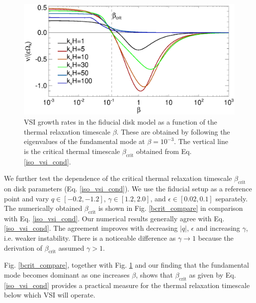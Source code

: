 \begin{figure}
   \includegraphics[width=\linewidth]{figures/gcorr_compare2} 
   \caption{VSI growth rates in the fiducial disk
     model as a function of the thermal relaxation timescale
     $\beta$. These are obtained by following the eigenvalues of the
     fundamental mode at $\beta=10^{-3}$. The vertical line is the
     critical thermal timescale $\beta_\mathrm{crit}$ obtained  
     from Eq. \ref{iso_vsi_cond}. 
     \label{bcrit_compare1}}   
 \end{figure} 
 
 We further test the dependence of the critical thermal relaxation timescale 
 $\beta_\mathrm{crit}$ on disk parameters
 (Eq. \ref{iso_vsi_cond}).  We use the fiducial setup as a
 reference point and vary $q\in[-0.2,-1.2]$, 
 $\gamma\in[1.2,2.0]$, and $\epsilon\in[0.02,0.1]$
 separately.
 The numerically obtained $\beta_\mathrm{crit}$ is shown in
 Fig. \ref{bcrit_compare} in comparison with Eq. \ref{iso_vsi_cond}.
 Our numerical results generally agree with Eq. \ref{iso_vsi_cond}. The
 agreement improves with decreasing  $|q|$,  $\epsilon$ and increasing
 $\gamma$, i.e. weaker instability. There is a noticeable difference
 as $\gamma\to1$ because the derivation of $\beta_\mathrm{crit}$
 assumed $\gamma>1$.   
 
 Fig. \ref{bcrit_compare}, together with Fig. \ref{bcrit_compare1} and 
 our finding that the fundamental mode becomes dominant as one
 increases $\beta$, shows that $\beta_\mathrm{crit}$ as given 
 by Eq. \ref{iso_vsi_cond} provides a  
 practical measure for the thermal relaxation timescale below which 
 VSI will operate. 



